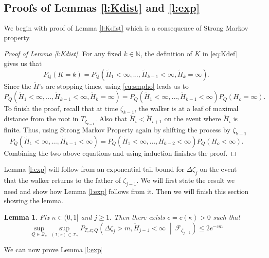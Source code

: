 \documentclass[a4paper]{amsart}
\newtheorem{lemma}{Lemma}
\newcommand{\hitfetak}{\widetilde{H}}
\begin{document}
\subsection{Proofs of Lemmas \ref{l:Kdist} and \ref{l:exp}}
We begin with proof of Lemma \ref{l:Kdist} which is a consequence of Strong Markov property.
\begin{proof}[Proof of Lemma \ref{l:Kdist}] For any fixed $k \in \mathbb{N}$, the definition of $K$ in \eqref{eq:Kdef} gives us that
\begin{equation}
    P_Q(K=k) = P_Q(\hitfetak_1 <\infty, \dots, \hitfetak_{k-1} < \infty, \hitfetak_k = \infty).
\end{equation}
    Since the $\hitfetak$'s are stopping times, using \eqref{eq:smpho} leads us to
    $$
        P_Q(\hitfetak_1 <\infty, \dots, \hitfetak_{k-1} < \infty, \hitfetak_k = \infty) = P_Q(\hitfetak_1 <\infty, \dots, \hitfetak_{k-1} < \infty)P_Q( H_o = \infty).
    $$
    To finish the proof, recall that at time $\zeta_{k-1}$, the walker is at a leaf of maximal distance from the root in $T_{\zeta_{k-1}}$. Also that $\hitfetak_i < \hitfetak_{i+1}$ on the event where $\hitfetak_i$ is finite. Thus, using Strong Markov Property again by shifting the process by $\zeta_{k-1}$
    $$
        P_Q(\hitfetak_1 <\infty, \dots, \hitfetak_{k-1} < \infty) = P_Q(\hitfetak_1 <\infty, \dots, \hitfetak_{k-2} < \infty)P_Q( H_o < \infty).
    $$
    Combining the two above equations and using induction finishes the proof.
\end{proof}
 Lemma \ref{l:exp} will follow from an exponential tail bound for $\Delta \zeta_j$ on the event that the walker returns to the father of $\zeta_{j-1}$. We will first state the result we need and show how Lemma \ref{l:exp} follows from it. Then we will finish this section showing the lemma.
 \begin{lemma}\label{l:Deltaz}Fix $\kappa \in (0,1]$ and $j\ge 1$. Then there exists $c = c(\kappa)>0$ such that
    $$
    \sup_{Q \in \mathcal{Q}_\kappa}\sup_{(T,x) \in \mathcal{T}_*}P_{T,x;Q}\left(\Delta \zeta_j > m, \hitfetak_{j-1} < \infty \; \middle | \; \mathcal{F}_{\zeta_{j-1}}\right ) \le 2e^{-cm}
    $$
     
\end{lemma}
We can now prove Lemma \ref{l:exp}
\end{document}
